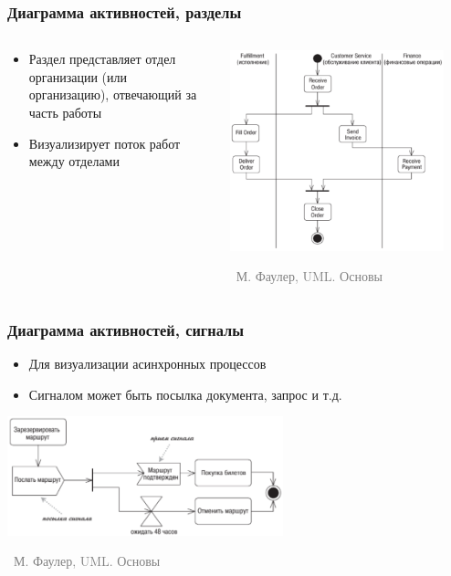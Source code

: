 \documentclass[xetex,mathserif,serif]{beamer}
\newcommand{\attribution}[1] {
	\vspace{-5mm}\begin{flushright}\begin{scriptsize}\textcolor{gray}{\textcopyright\, #1}\end{scriptsize}\end{flushright}
}
\begin{document}
	\begin{frame}
		\frametitle{Диаграмма активностей, разделы}
		\begin{columns}
			\begin{column}{0.5\textwidth}
				\begin{itemize}
					\item Раздел представляет отдел организации (или организацию), отвечающий за часть работы
					\item Визуализирует поток работ между отделами
				\end{itemize}
			\end{column}
			\begin{column}{0.5\textwidth}
				\begin{center}
					\includegraphics[width=0.9\textwidth]{activitySwimlanes.png}
					\attribution{М. Фаулер, UML. Основы}
				\end{center}
			\end{column}
		\end{columns}
	\end{frame}

	\begin{frame}
		\frametitle{Диаграмма активностей, сигналы}
		\begin{itemize}
			\item Для визуализации асинхронных процессов
			\item Сигналом может быть посылка документа, запрос и т.д.
		\end{itemize}
		\begin{center}
			\includegraphics[width=0.6\textwidth]{activitySignals.png}
			\attribution{М. Фаулер, UML. Основы}
		\end{center}
	\end{frame}
\end{document}
